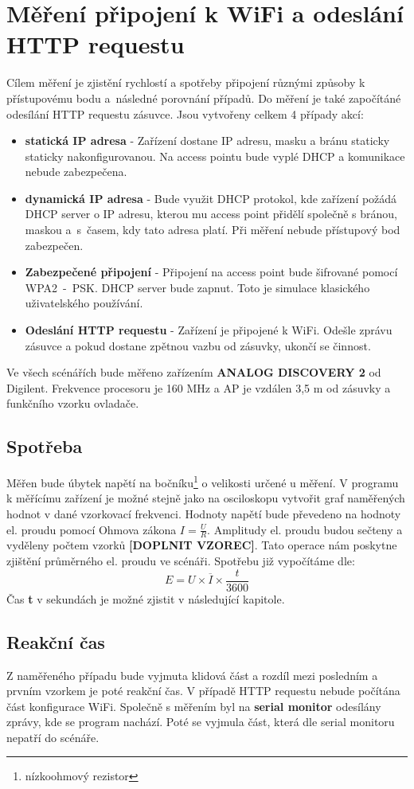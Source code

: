 \documentclass[a4paper, 12pt]{report}
\begin{document}
		\section{Měření připojení k WiFi a odeslání HTTP requestu} \label{metodika:wifi}
				Cílem měření je zjistění rychlostí a spotřeby připojení různými způsoby k přístupovému bodu a~následné porovnání případů. Do měření je také započítáné odesílání HTTP requestu zásuvce. Jsou vytvořeny celkem 4 případy akcí:
				\begin{itemize}
					\item {\bf statická IP adresa} - 	Zařízení dostane IP adresu, masku a bránu staticky staticky nakonfigurovanou. Na access pointu bude vyplé DHCP a komunikace nebude zabezpečena.
					\item {\bf dynamická IP adresa} - Bude využit DHCP protokol, kde zařízení požádá DHCP server o IP adresu, kterou mu access point přidělí společně s bránou, maskou a~s~časem, kdy tato adresa platí. Při měření nebude přístupový bod zabezpečen.
					\item {\bf Zabezpečené připojení} - Připojení na access point bude šifrované pomocí WPA2~-~PSK. DHCP server bude zapnut. Toto je simulace klasického uživatelského používání.
					\item {\bf Odeslání HTTP requestu} - Zařízení je připojené k WiFi. Odešle zprávu zásuvce a pokud dostane zpětnou vazbu od zásuvky, ukončí se činnost.
				\end{itemize}
				Ve všech scénářích bude měřeno zařízením {\bf ANALOG DISCOVERY 2} od Digilent. Frekvence procesoru je 160 \si{MHz} a AP je vzdálen 3,5 \si{m} od zásuvky a funkčního vzorku ovladače.
				\subsection{Spotřeba} \label{metodika:wifi spotreba}
					Měřen bude úbytek napětí na bočníku\footnote{nízkoohmový rezistor} o velikosti určené u měření. V programu k měřícímu zařízení je možné stejně jako na osciloskopu vytvořit graf naměřených hodnot v dané vzorkovací frekvenci. Hodnoty napětí bude převedeno na hodnoty el. proudu pomocí Ohmova zákona $I = \frac{U}{R}$. Amplitudy el. proudu budou sečteny a vyděleny počtem vzorků {\bf[DOPLNIT VZOREC]}. Tato operace nám poskytne zjištění průměrného el. proudu ve scénáři. Spotřebu již vypočítáme dle:
					$$E = U \times \overline{I} \times \frac{t}{3600}$$
					Čas {\bf t} v sekundách je možné zjistit v následující kapitole.
				\subsection{Reakční čas} \label{metodika:wifi reakce}
					Z naměřeného případu bude vyjmuta klidová část a rozdíl mezi posledním a prvním vzorkem je poté reakční čas. V případě HTTP requestu nebude počítána část konfigurace WiFi. Společně s měřením byl na {\bf serial monitor} odesílány zprávy, kde se program nachází. Poté se vyjmula část, která dle serial monitoru nepatří do scénáře.
\end{document}
